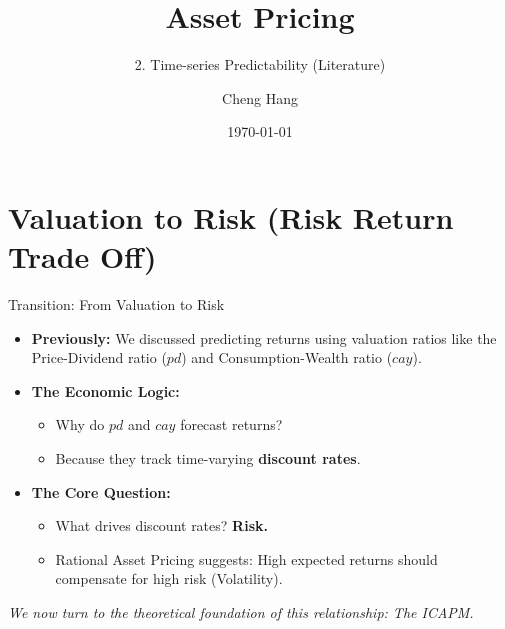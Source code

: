 \documentclass{beamer}
\title[Asset Pricing]{\textbf{Asset Pricing}} %
\subtitle{2. Time-series Predictability (Literature)}
\author[Cheng Hang]{Cheng Hang} %
\institute[DUFE] %
{School of Fintech \\
	Dongbei University of Finance \& Economics \\ %
	\medskip
	\textbf{chenghangch@qq.com}%
}
\date{\today} %
\begin{document}
	
\begin{frame}
	\titlepage %
\end{frame}


\section{Valuation to Risk (Risk Return Trade Off)}
\begin{frame}{Transition: From Valuation to Risk}
    \begin{itemize}
        \item \textbf{Previously:} We discussed predicting returns using valuation ratios like the Price-Dividend ratio ($pd$) and Consumption-Wealth ratio ($cay$). 
        \item \textbf{The Economic Logic:} 
            \begin{itemize}
                \item Why do $pd$ and $cay$ forecast returns? 
                \item Because they track time-varying \textbf{discount rates}.
            \end{itemize}
        \item \textbf{The Core Question:} 
            \begin{itemize}
                \item What drives discount rates? \textbf{Risk.}
                \item Rational Asset Pricing suggests: High expected returns should compensate for high risk (Volatility).
            \end{itemize}
    \end{itemize}
    \vspace{0.5cm}
    \centering
    \textit{We now turn to the theoretical foundation of this relationship: The ICAPM.}
\end{frame}
\end{document}
